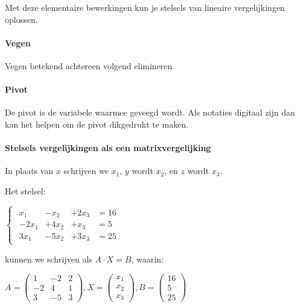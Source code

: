 \documentclass[11pt]{article}
\begin{document}
Met deze elementaire bewerkingen kun je stelsels van lineaire
vergelijkingen oplossen.

    \hypertarget{vegen}{%
\paragraph{Vegen}\label{vegen}}

    Vegen betekend achtereen volgend elimineren.

    \hypertarget{pivot}{%
\paragraph{Pivot}\label{pivot}}

    De pivot is de variabele waarmee geveegd wordt. Als notaties digitaal
zijn dan kan het helpen om de pivot dikgedrukt te maken.

    \hypertarget{stelsels-vergelijkingen-als-een-matrixvergelijking}{%
\paragraph{Stelsels vergelijkingen als een
matrixvergelijking}\label{stelsels-vergelijkingen-als-een-matrixvergelijking}}

    In plaats van \(x\) schrijven we \(x_1\), \(y\) wordt \(x_2\), en \(z\)
wordt \(x_3\).

Het stelsel:

\(\begin{cases}\begin{align}x_1 & -x_2 & +2x_3 &= 16 \\ -2x_1 & +4x_2 & +x_3 &= 5 \\ 3x_1 & -5x_2 & +3x_3 &= 25\end{align}\end{cases}\)

kunnen we schrijven als \(A \cdot X = B\), waarin:

\(A=\begin{pmatrix}1 & -2 & 2 \\ -2 & 4 & 1 \\ 3 & -5 & 3\end{pmatrix}, X = \begin{pmatrix}x_1\\x_2\\x_3\end{pmatrix}, B=\begin{pmatrix}16\\5\\25\end{pmatrix}\)
\end{document}
